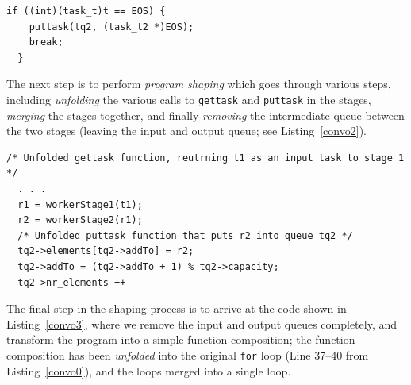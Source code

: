 \begin{lstlisting}[label=convo1, caption={Convolution, Repaired with a Termination Token},frame=single]
  if ((int)(task_t)t == EOS) {
    puttask(tq2, (task_t2 *)EOS);
    break;
  }
  \end{lstlisting}


\noindent
The next step is to perform \emph{program shaping} which goes through various steps, including \emph{unfolding} the various calls to \lstinline{gettask} and \lstinline{puttask} in the stages, \emph{merging} the stages together, and finally \emph{removing} the intermediate queue between the two stages (leaving the input and output queue; see Listing~\ref{convo2}). 

\begin{lstlisting}[label=convo2, caption={Stages merged, unfolded and intermediate queue removed},frame=single]
  /* Unfolded gettask function, reutrning t1 as an input task to stage 1 */
  . . .
  r1 = workerStage1(t1);
  r2 = workerStage2(r1);
  /* Unfolded puttask function that puts r2 into queue tq2 */
  tq2->elements[tq2->addTo] = r2;
  tq2->addTo = (tq2->addTo + 1) % tq2->capacity;
  tq2->nr_elements ++
\end{lstlisting}

\noindent
The final step in the shaping process is to arrive at the code shown in Listing~\ref{convo3}, where we remove the input and output queues completely, and transform the program into a simple function composition; the function composition has been \emph{unfolded} into the original \lstinline{for} loop (Line 37--40 from Listing~\ref{convo0}), and the loops merged into a single loop. 



